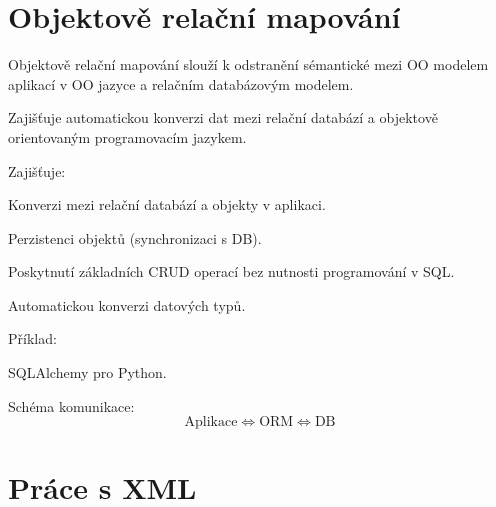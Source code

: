 
\section{Objektově relační mapování}

\begin{compactitem}
    \item Objektově relační mapování slouží k odstranění sémantické  mezi OO modelem aplikací v OO jazyce a relačním databázovým modelem.
    \begin{compactitem}
        \item Zajišťuje automatickou konverzi dat mezi relační databází a objektově orientovaným programovacím jazykem.
    \end{compactitem}

    \item Zajišťuje: \begin{compactitem}
        \item Konverzi mezi relační databází a objekty v aplikaci.
        \item Perzistenci objektů (synchronizaci s DB).
        \item Poskytnutí základních CRUD operací bez nutnosti programování v SQL.
        \item Automatickou konverzi datových typů.
    \end{compactitem}

    \item Příklad: \begin{compactitem}
        \item SQLAlchemy pro Python.
    \end{compactitem}

    \item Schéma komunikace:
    $$ \text{Aplikace} \Leftrightarrow \text{ORM} \Leftrightarrow \text{DB} $$
\end{compactitem}


\section{Práce s XML}

